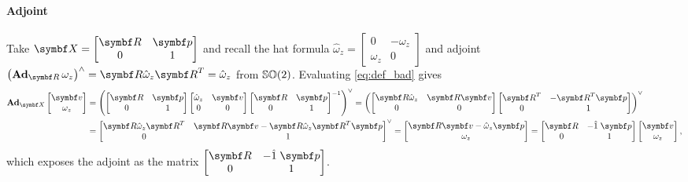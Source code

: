 \paragraph{Adjoint}

Take $\X = \begin{bmatrix} \bR & \bp \\ 0 & 1 \end{bmatrix}$ and recall the hat formula $\hat \omega_{z} = \begin{bmatrix} 0 & -\omega_{z} \\ \omega_{z} & 0 \end{bmatrix}$ and adjoint $\left(\bAd_{\bR} \omega_{z} \right)^{\wedge} = \bR \hat \omega_{z} \bR^{T} = \hat \omega_{z}$ from ${\mathbb{SO}(2)}$. Evaluating \eqref{eq:def_bad} gives
\begin{equation}
  \begin{aligned}
    \bAd_{\X} \begin{bmatrix} \bv \\ \omega_{z} \end{bmatrix}
    & = \left( \begin{bmatrix} \bR & \bp \\ 0 & 1 \end{bmatrix}
    \begin{bmatrix}
      \hat \omega_{z} & \bv \\ 0 & 0
    \end{bmatrix}
    \begin{bmatrix} \bR & \bp \\ 0 & 1 \end{bmatrix}^{-1} \right)^{\vee}
    = \left( \begin{bmatrix} \bR \hat \omega_{z} & \bR \bv \\ 0 & 0 \end{bmatrix}
    \begin{bmatrix} \bR^{T} & -\bR^{T} \bp \\ 0 & 1 \end{bmatrix} \right)^{\vee} \\
    & = \begin{bmatrix} \bR \hat \omega_{z} \bR^{T} & \bR \bv - \bR \hat \omega_{z} \bR^{T} \bp \\ 0 & 1 \end{bmatrix}^{\vee}
    = \begin{bmatrix} \bR \bv - \hat \omega_{z} \bp \\ \omega_{z} \end{bmatrix} =
    \begin{bmatrix}
      \bR & -\hat 1 \; \bp
       \\ 0 & 1
    \end{bmatrix}
    \begin{bmatrix} \bv \\ \omega_{z} \end{bmatrix}
   ,
  \end{aligned}
\end{equation}
which exposes the adjoint as the matrix $\begin{bmatrix} \bR & -\hat 1 \; \bp \\ 0 & 1 \end{bmatrix}$.

